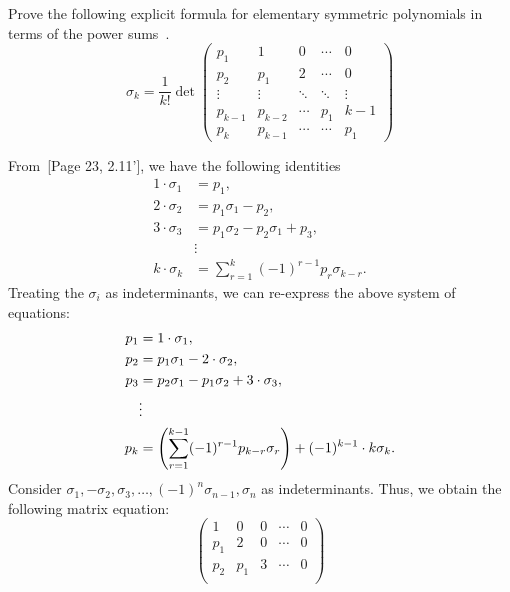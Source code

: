 \documentclass[letterpaper, 11pt, oneside]{book}
\begin{document}
\begin{exercise}
  Prove the following explicit formula for elementary symmetric polynomials in terms of the power sums~\cite[Page 29]{book:MacdonaldSymmetricHall}.
  \[
    \sigma_{k} = \frac{1}{k!}
    \det
    \begin{pmatrix}
      p_{1} & 1 & 0 & \cdots & 0 \\
      p_{2} & p_{1} & 2 & \cdots & 0 \\
      \vdots & \vdots & \ddots & \ddots & \vdots \\
      p_{k - 1} & p_{k - 2} & \cdots & p_{1} & k - 1 \\
      p_{k} & p_{k - 1} & \cdots & \cdots & p_{1}
    \end{pmatrix}
  \]
\end{exercise}
\begin{sol}
  From~[Page 23, 2.11']\cite{book:MacdonaldSymmetricHall}, we have the following identities
  \begin{align*}
    1 \cdot \sigma_{1} &= p_{1}, \\
    2 \cdot \sigma_{2} &= p_{1} \sigma_{1} - p_{2}, \\
    3 \cdot \sigma_{3} &= p_{1} \sigma_{2} - p_{2} \sigma_{1} + p_{3}, \\
                       &\vdots \\
    k \cdot \sigma_{k} &= \sum_{r = 1}^{k} (-1)^{r - 1} p_{r} \sigma_{k - r}.
  \end{align*}
Treating the $\sigma_{i}$ as indeterminants, we can re-express the above system of equations:
\begin{align*}
  p_{1} &= 1 \cdot \sigma_{1}, \\
  p_{2} &= p_{1} \sigma_{1} - 2 \cdot \sigma_{2}, \\
  p_{3} &= p_{2} \sigma_{1} - p_{1} \sigma_{2} + 3 \cdot \sigma_{3}, \\
        &\vdots \\
  p_{k} &= \pqty{\sum_{r = 1}^{k - 1} (-1)^{r - 1} p_{k - r} \sigma_{r}} + (-1)^{k - 1} \cdot k \sigma_{k}.
\end{align*}
Consider $\sigma_{1}, -\sigma_{2}, \sigma_{3}, \ldots, (-1)^{n} \sigma_{n - 1}, \sigma_{n}$ as indeterminants.
Thus, we obtain the following matrix equation:
\[
  \begin{pmatrix}
    1 & 0 & 0 & \cdots & 0 \\
    p_{1} & 2 & 0 & \cdots & 0 \\
    p_{2} & p_{1} & 3 & \cdots & 0 \\

\end{pmatrix}\]
\end{sol}
\end{document}
